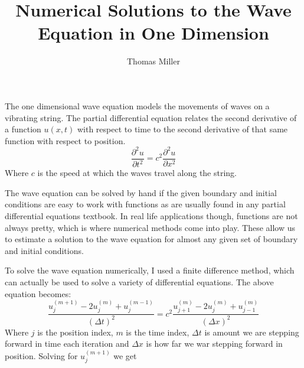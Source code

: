 \documentclass{article}
\begin{document}
\title{Numerical Solutions to the Wave Equation in One Dimension}
\author{Thomas Miller}
\maketitle

The one dimensional wave equation models the movements of waves on a vibrating string. The partial differential equation
relates the second derivative of a function $u(x,t)$ with respect to time to the second derivative
of that same function with respect to position.
\[ \frac{\partial^2 u}{\partial t^2} = c^2 \frac{\partial^2 u}{\partial x^2} \]
Where $c$ is the speed at which the waves travel along the string.

The wave equation can be solved by hand if the given boundary and initial conditions are easy to work
with functions as are usually found in any partial differential equations textbook. In real life applications though, functions are not always pretty, which is where numerical methods come into play. These allow us to estimate a solution to the wave equation for almost any given set of boundary and initial conditions.

To solve the wave equation numerically, I used a finite difference method, which can actually be used to solve a variety of differential equations. The above equation becomes:
\[\frac{u_{j}^{(m+1)} - 2u_{j}^{(m)} + u_{j}^{(m-1)}}{(\Delta t)^2} = 
c^2\frac{u_{j+1}^{(m)} - 2u_{j}^{(m)} + u_{j-1}^{(m)}}{(\Delta x)^2} \]
Where $j$ is the position index, $m$ is the time index, $\Delta t$ is amount we are stepping forward
in time each iteration and $\Delta x$ is how far we war stepping forward in position. Solving for $u_{j}^{(m+1)}$ we get
\end{document}
